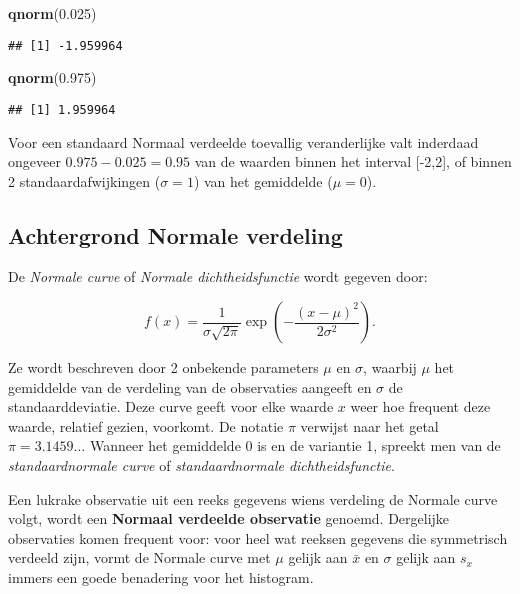\documentclass[
  12pt,dutch,coursenotes]{book}
\newenvironment{Shaded}{\begin{snugshade}}{\end{snugshade}}
\newcommand{\FloatTok}[1]{\textcolor[rgb]{0.00,0.00,0.81}{#1}}
\newcommand{\KeywordTok}[1]{\textcolor[rgb]{0.13,0.29,0.53}{\textbf{#1}}}
\newcommand{\NormalTok}[1]{#1}
\theoremstyle{definition}
\theoremstyle{definition}
\theoremstyle{definition}
\theoremstyle{remark}
\begin{document}
\begin{Shaded}
\begin{Highlighting}[]
\KeywordTok{qnorm}\NormalTok{(}\FloatTok{0.025}\NormalTok{)}
\end{Highlighting}
\end{Shaded}

\begin{verbatim}
## [1] -1.959964
\end{verbatim}

\begin{Shaded}
\begin{Highlighting}[]
\KeywordTok{qnorm}\NormalTok{(}\FloatTok{0.975}\NormalTok{)}
\end{Highlighting}
\end{Shaded}

\begin{verbatim}
## [1] 1.959964
\end{verbatim}

Voor een standaard Normaal verdeelde toevallig veranderlijke valt inderdaad ongeveer \(0.975 - 0.025=0.95\) van de waarden binnen het interval {[}-2,2{]}, of binnen 2 standaardafwijkingen (\(\sigma=1\)) van het gemiddelde (\(\mu=0\)).

\hypertarget{subsec:normalcalc}{%
\subsection{Achtergrond Normale verdeling}\label{subsec:normalcalc}}

De \emph{Normale curve} of \emph{Normale dichtheidsfunctie} wordt gegeven door:

\begin{equation*}
f(x) = \frac{1}{\sigma \sqrt{2 \pi} } \exp \left ( - \frac{ (x - \mu)^2 }{ 2
\sigma^2} \right ).
\end{equation*}

Ze wordt beschreven door 2 onbekende parameters \(\mu\) en \(\sigma\), waarbij \(\mu\) het gemiddelde van de verdeling van de observaties aangeeft en \(\sigma\)
de standaarddeviatie. Deze curve geeft voor elke waarde \(x\) weer hoe
frequent deze waarde, relatief gezien, voorkomt. De notatie \(\pi\) verwijst
naar het getal \(\pi=3.1459...\) Wanneer het gemiddelde 0 is en de variantie
1, spreekt men van de \emph{standaardnormale curve} of \emph{standaardnormale dichtheidsfunctie}.

Een lukrake observatie uit een reeks gegevens wiens verdeling de Normale
curve volgt, wordt een \textbf{Normaal verdeelde observatie} genoemd.
Dergelijke observaties komen frequent voor: voor heel wat reeksen gegevens
die symmetrisch verdeeld zijn, vormt de Normale curve met \(\mu\) gelijk aan \(\bar x\) en \(\sigma\) gelijk aan \(s_x\) immers een goede benadering voor het
histogram.
\end{document}

